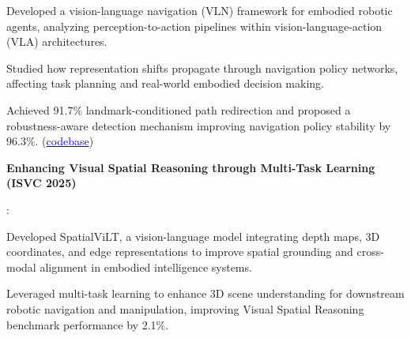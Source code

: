 \documentclass[letterpaper,10.5pt]{article}
\newcommand{\resumeItem}[2]{
  \item\small{
    \textbf{#1}{: #2 \vspace{-1pt}} %
  }
}
\newcommand{\resumeSubItem}[2]{\resumeItem{#1}{#2}\vspace{-1pt}} %
\begin{document}
\item \textbullet \quad Developed a vision-language navigation (VLN) framework for embodied robotic agents, analyzing perception-to-action pipelines within vision-language-action (VLA) architectures.

\textbullet \quad Studied how representation shifts propagate through navigation policy networks, affecting task planning and real-world embodied decision making.

\textbullet \quad Achieved 91.7\% landmark-conditioned path redirection and proposed a robustness-aware detection mechanism improving navigation policy stability by 96.3\%. (\href{https://github.com/programminglove08/RobustnessVisualNav/tree/main}{\textcolor{blue}{codebase}})

\resumeSubItem{Enhancing Visual Spatial Reasoning through Multi-Task Learning \textnormal{(ISVC 2025)}}

\item \textbullet \quad Developed SpatialViLT, a vision-language model integrating depth maps, 3D coordinates, and edge representations to improve spatial grounding and cross-modal alignment in embodied intelligence systems.

\textbullet \quad Leveraged multi-task learning to enhance 3D scene understanding for downstream robotic navigation and manipulation, improving Visual Spatial Reasoning benchmark performance by 2.1\%.




\end{document}
